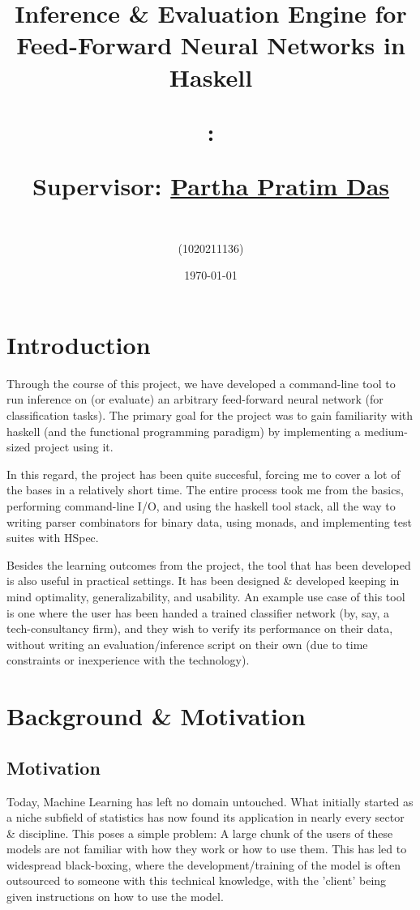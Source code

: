 \documentclass[12pt, titlepage]{article}
\title{Inference \& Evaluation Engine for Feed-Forward Neural Networks in Haskell\vspace*{2mm}

{\large \code: \name}

{\large Supervisor: \href{https://www.ashoka.edu.in/profile/partha-pratim-das/}{Partha Pratim Das}}}
\author{\textbf{\me}\\(1020211136)}
\date{\today}
\begin{document}
\maketitle

\tableofcontents
\newpage

\section{Introduction}
Through the course of this project, we have developed a command-line tool to run inference on (or evaluate) an arbitrary feed-forward neural network (for classification tasks). The primary goal for the project was to gain familiarity with haskell (and the functional programming paradigm) by implementing a medium-sized project using it.\bigskip

In this regard, the project has been quite succesful, forcing me to cover a lot of the bases in a relatively short time. The entire process took me from the basics, performing command-line I/O, and using the haskell tool stack, all the way to writing parser combinators for binary data, using monads, and implementing test suites with HSpec.\bigskip

Besides the learning outcomes from the project, the tool that has been developed is also useful in practical settings. It has been designed \& developed keeping in mind optimality, generalizability, and usability. An example use case of this tool is one where the user has been handed a trained classifier network (by, say, a tech-consultancy firm), and they wish to verify its performance on their data, without writing an evaluation/inference script on their own (due to time constraints or inexperience with the technology).

\section{Background \& Motivation}
\subsection{Motivation}
Today, Machine Learning has left no domain untouched. What initially started as a niche subfield of statistics has now found its application in nearly every sector \& discipline. This poses a simple problem: A large chunk of the users of these models are not familiar with how they work or how to use them. This has led to widespread black-boxing, where the development/training of the model is often outsourced to someone with this technical knowledge, with the 'client' being given instructions on how to use the model.\bigskip
\end{document}
